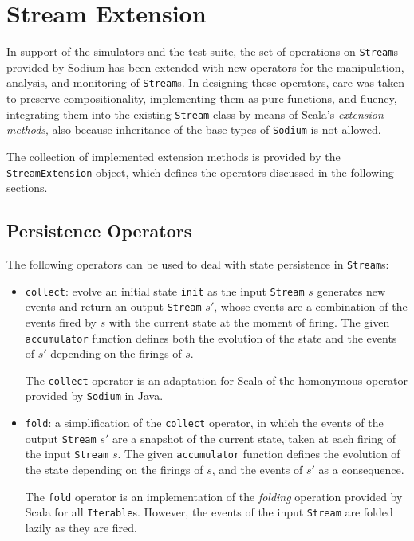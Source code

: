 
\section{Stream Extension}
\label{section:implementation:stream-extension}

In support of the simulators and the test suite, the set of operations on
\texttt{Stream}s provided by Sodium has been extended with new operators for
the manipulation, analysis, and monitoring of \texttt{Stream}s. In designing
these operators, care was taken to preserve compositionality, implementing them
as pure functions, and fluency, integrating them into the existing
\texttt{Stream} class by means of Scala's \textit{extension methods}, also
because inheritance of the base types of \texttt{Sodium} is not allowed.

The collection of implemented extension methods is provided by the
\texttt{StreamEx\-tension} object, which defines the operators discussed in the
following sections.

\subsection{Persistence Operators}

The following operators can be used to deal with state persistence in
\texttt{Stream}s:

\begin{itemize}
  \item \texttt{collect}: evolve an initial state \texttt{init} as the
        input \texttt{Stream} $s$ generates new events and return an output
        \texttt{Stream} $s'$, whose events are a combination of the events
        fired by $s$ with the current state at the moment of firing. The given
        \texttt{accumulator} function defines both the evolution of the state
        and the events of $s'$ depending on the firings of $s$.

        The \texttt{collect} operator is an adaptation for Scala of the
        homonymous operator provided by \texttt{Sodium} in Java.

  \item \texttt{fold}: a simplification of the \texttt{collect}
        operator, in which the events of the output \texttt{Stream} $s'$ are a
        snapshot of the current state, taken at each firing of the input
        \texttt{Stream} $s$. The given \texttt{accumulator} function defines
        the evolution of the state depending on the firings of $s$, and the
        events of $s'$ as a consequence.

        The \texttt{fold} operator is an implementation of the \textit{folding}
        operation provided by Scala for all \texttt{Iterable}s. However, the
        events of the input \texttt{Stream} are folded lazily as they are
        fired.
\end{itemize}

